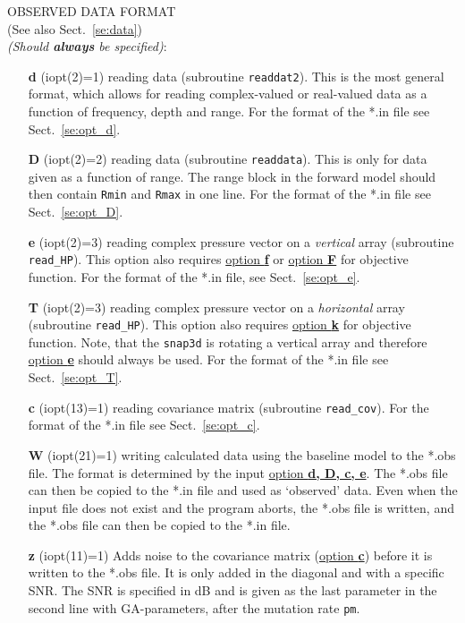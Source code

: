 \documentclass{saclantc}
\begin{document}
\noindent OBSERVED DATA FORMAT\\
(See also Sect.~\ref{se:data})\\
{\it (Should {\bf always} be specified)}:

\vspace{-0.6cm}
\begin{itemize}
    \item[{\bf d}] (iopt(2)=1)   reading data (subroutine {\tt readdat2}).
This is the most general format, which allows for reading complex-valued or real-valued data as a function of frequency, depth and range.
For the format of the *.in file see Sect.\ \ref{se:opt_d}.
\vspace{-0.3cm}
    \item[{\bf D}] (iopt(2)=2)   reading  data (subroutine {\tt readdata}).
This is only for data given as a function of range. The range block in
the forward model should then contain {\tt Rmin} and {\tt Rmax} in one line.
For the format of the *.in file see Sect.\ \ref{se:opt_D}.
\vspace{-0.3cm}
    \item[{\bf e}] (iopt(2)=3)   reading complex pressure vector on a
      {\it vertical}
array (subroutine {\tt read\_HP}). This option also requires
\underline{option {\bf f}} or \underline{option {\bf F}} 
for objective function.
For the format of the *.in file, see Sect.\ \ref{se:opt_e}.
\vspace{-0.3cm}
    \item[{\bf T}] (iopt(2)=3)   reading complex pressure vector on a
      {\it horizontal}
array (subroutine {\tt read\_HP}). This option also requires
\underline{option {\bf k}} for objective function.
Note, that the {\tt snap3d} is rotating a vertical array and therefore
   \underline{option {\bf e}} should always be used.
For the format of the *.in file see Sect.\ \ref{se:opt_T}.
\vspace{-0.3cm}
    \item[{\bf c}] (iopt(13)=1)   reading covariance matrix 
(subroutine {\tt read\_cov}).
For the format of the *.in file see Sect.\ \ref{se:opt_c}.
\vspace{-0.3cm}
    \item[{\bf W}] (iopt(21)=1) writing calculated data using
the baseline model to the *.obs file.
  The format is determined by the input \underline{option {\bf d, D, c, e}}.
The *.obs file can then be copied to the *.in  file and used as `observed'
data. Even when the input file does not exist and the program aborts,
the *.obs file  is written, and the *.obs file can then be copied to the *.in file.
\vspace{-0.3cm}
    \item[{\bf z}] (iopt(11)=1)
 Adds noise to the covariance matrix (\underline{option {\bf c}})
before it is written to the *.obs file.  
It is only added 
   in the diagonal and with a specific SNR.  The SNR is specified in dB
   and is given as the last  parameter 
in the second line with GA-parameters, after the
   mutation rate {\tt pm}.


\end{itemize}
	
\end{document}
